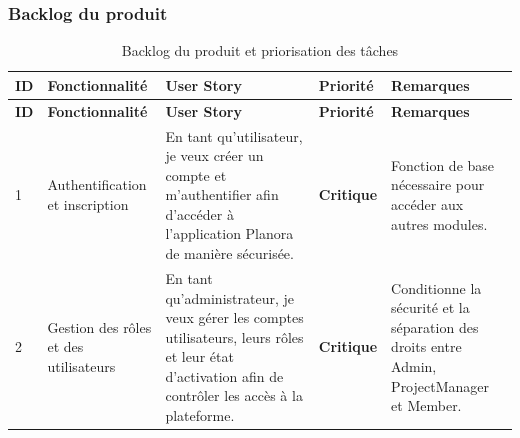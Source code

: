 \subsubsection{Backlog du produit}
\small
\renewcommand{\arraystretch}{1.25}
\enlargethispage{3\baselineskip}
\begin{longtable}{|p{0.8cm}|p{3.7cm}|p{5.3cm}|p{1.8cm}|p{3.8cm}|}
  \caption{Backlog du produit et priorisation des tâches}\label{tab:backlog-produit}                                                                                                                                                                                                                                                                                \\
  \hline
  \textbf{ID} & \textbf{Fonctionnalité}                   & \textbf{User Story}                                                                                                                                          & \textbf{Priorité}                           & \textbf{Remarques}                                                                         \\
  \hline
  \endfirsthead

  \hline
  \textbf{ID} & \textbf{Fonctionnalité}                   & \textbf{User Story}                                                                                                                                          & \textbf{Priorité}                           & \textbf{Remarques}                                                                         \\
  \hline
  \endhead

  \hline
  \endfoot

  \hline
  \endlastfoot

  1           & Authentification et inscription           & En tant qu'utilisateur, je veux créer un compte et m'authentifier afin d'accéder à l'application Planora de manière sécurisée.                               & \cellcolor{niveauCritique}\textbf{Critique} & Fonction de base nécessaire pour accéder aux autres modules.                               \\
  \hline

  2           & Gestion des rôles et des utilisateurs     & En tant qu'administrateur, je veux gérer les comptes utilisateurs, leurs rôles et leur état d'activation afin de contrôler les accès à la plateforme.        & \cellcolor{niveauCritique}\textbf{Critique} & Conditionne la sécurité et la séparation des droits entre Admin, ProjectManager et Member. \\
  \hline


\end{longtable}
